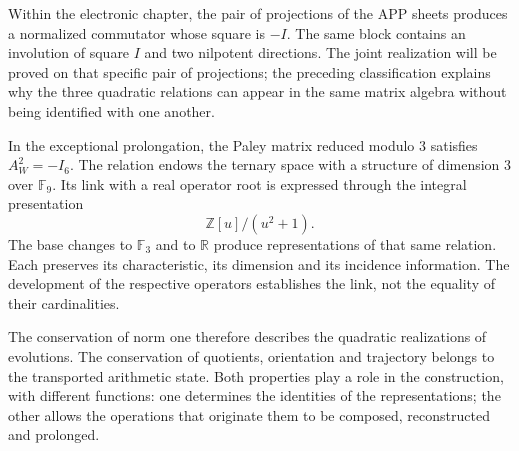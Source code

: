 Within the electronic chapter, the pair of projections of the APP sheets
produces a normalized commutator whose square is \(-I\). The same block
contains an involution of square \(I\) and two nilpotent directions. The
joint realization will be proved on that specific pair of projections;
the preceding classification explains why the three quadratic relations
can appear in the same matrix algebra without being identified with one another.

In the exceptional prolongation, the Paley matrix reduced modulo \(3\)
satisfies \(A_W^2=-I_6\). The relation endows the ternary space with a
structure of dimension \(3\) over \(\mathbb F_9\). Its link with a real
operator root is expressed through the integral presentation
\[
 \mathbb Z[u]/(u^2+1).
\]
The base changes to \(\mathbb F_3\) and to \(\mathbb R\) produce
representations of that same relation. Each preserves its characteristic,
its dimension and its incidence information. The development of the
respective operators establishes the link, not the equality of their
cardinalities.

The conservation of norm one therefore describes the quadratic
realizations of evolutions. The conservation of quotients, orientation and
trajectory belongs to the transported arithmetic state. Both properties
play a role in the construction, with different functions: one determines the
identities of the representations; the other allows the operations that originate them
to be composed, reconstructed and prolonged.




